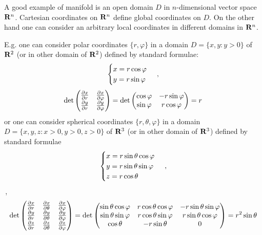 \documentclass[12pt]{article}
\theoremstyle{theorem}
\numberwithin{equation}{section}
\begin{document}
    A good example of manifold is an open domain  $D$ in  $n$-dimensional vector space ${\bf R}^n$.
    Cartesian coordinates on ${\bf R}^n$ define global coordinates on $D$.
    On the other hand one can consider an arbitrary local coordinates in different domains in ${\bf R}^n$.

    E.g. one can consider polar coordinates $\{r,\varphi\}$ in a domain $D=\{x,y\colon y>0\}$ of ${\bf R}^2$
    (or in other domain of ${\bf R}^2$) defined by standard formulae:
              \begin{equation*}
                \begin{cases}
                x=r\cos\varphi\cr y=r\sin\varphi\cr
                \end{cases}\,,
              \end{equation*}
            \begin{equation}\label{jacobianofpolartransform}
                \det
          \begin{pmatrix}
          {\partial x\over \partial r} &{\partial x\over \partial \varphi}\cr
          {\partial y\over \partial r} &{\partial y\over \partial \varphi}\cr
          \end{pmatrix}=
                \det
          \begin{pmatrix}
          \cos\varphi &-r\sin\varphi\cr
          \sin\varphi &r\cos\varphi\cr
          \end{pmatrix}=r
            \end{equation}
             or one can consider spherical coordinates  $\{r,\theta,\varphi\}$ in a domain
  $D=\{x,y,z\colon x>0,y>0, z>0\}$ of ${\bf R}^3$ (or in other domain of ${\bf R}^3$)
  defined by standard formulae
  \begin{equation*}
                \begin{cases}
                x=r\sin\theta\cos\varphi\cr y=r\sin\theta\sin\varphi\cr z=r\cos\theta
                \end{cases}\,,
              \end{equation*}\,,
              \begin{equation}\label{jacobianofspherictransform}
                \det
          \begin{pmatrix}
          {\partial x\over \partial r} &{\partial x\over \partial \theta} &{\partial x\over \partial \varphi}\cr
          {\partial y\over \partial r} &{\partial y\over \partial \theta} &{\partial y\over \partial \varphi}\cr
           {\partial z\over \partial r} &{\partial z\over \partial \theta} &{\partial z\over \partial \varphi}\cr
          \end{pmatrix}=
                \det
          \begin{pmatrix}
          \sin\theta\cos\varphi &r\cos\theta\cos\varphi &-r\sin\theta\sin\varphi\cr
          \sin\theta\sin\varphi &r\cos\theta\sin\varphi &r\sin\theta\cos\varphi\cr
           \cos\theta &-r\sin\theta &0\cr
                 \end{pmatrix}=r^2\sin\theta
            \end{equation}
\end{document}
